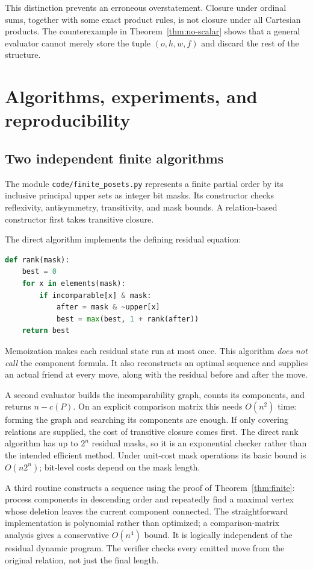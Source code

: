 \documentclass[11pt,letterpaper]{article}
\theoremstyle{definition}
\theoremstyle{remark}
\begin{document}
This distinction prevents an erroneous overstatement. Closure under
ordinal sums, together with some exact product rules, is not closure under
all Cartesian products. The counterexample in
Theorem~\ref{thm:no-scalar} shows that a general evaluator cannot merely
store the tuple $(o,h,w,f)$ and discard the rest of the structure.

\section{Algorithms, experiments, and reproducibility}\label{sec:computation}

\subsection{Two independent finite algorithms}
The module \texttt{code/finite\_posets.py} represents a finite partial
order by its inclusive principal upper sets as integer bit masks. Its
constructor checks reflexivity, antisymmetry, transitivity, and mask
bounds. A relation-based constructor first takes transitive closure.

The direct algorithm implements the defining residual equation:
\begin{lstlisting}[language=Python]
def rank(mask):
    best = 0
    for x in elements(mask):
        if incomparable[x] & mask:
            after = mask & ~upper[x]
            best = max(best, 1 + rank(after))
    return best
\end{lstlisting}
Memoization makes each residual state run at most once. This algorithm
\emph{does not call} the component formula. It also reconstructs an optimal
sequence and supplies an actual friend at every move, along with the
residual before and after the move.

A second evaluator builds the incomparability graph, counts its components,
and returns $n-c(P)$. On an explicit comparison matrix this needs
$O(n^2)$ time: forming the graph and searching its components are enough.
If only covering relations are supplied, the cost of transitive closure
comes first. The direct rank algorithm has up to $2^n$ residual masks,
so it is an exponential checker rather than the intended efficient
method. Under unit-cost mask operations its basic bound is $O(n2^n)$;
bit-level costs depend on the mask length.

A third routine constructs a sequence using the proof of
Theorem~\ref{thm:finite}: process components in descending order and
repeatedly find a maximal vertex whose deletion leaves the current
component connected. The straightforward implementation is polynomial
rather than optimized; a comparison-matrix analysis gives a conservative
$O(n^4)$ bound. It is logically independent of the residual dynamic
program. The verifier checks every emitted move from the original
relation, not just the final length.
\end{document}
